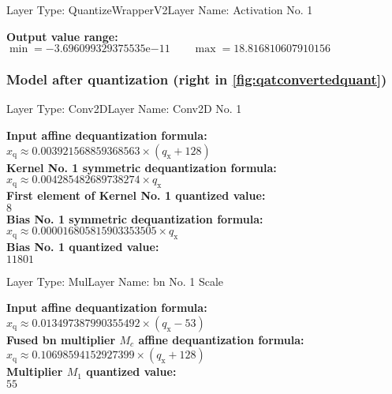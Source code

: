 {\begin{layerbox}{Layer Type: QuantizeWrapperV2}{Layer Name: Activation No. 1}
  \begin{center}
    \textbf{Output value range:} \\[2pt]
    $\min = -3.696099329375535 \mathrm{e}{-11} \quad\quad \max = 18.816810607910156$
  \end{center}
\end{layerbox}

\clearpage
\subsubsection*{Model after quantization (right in \autoref{fig:qatconvertedquant})}

\begin{layerbox}{Layer Type: Conv2D}{Layer Name: Conv2D No. 1}
  \begin{center}
    \textbf{Input affine dequantization formula:} \\[2pt]
    $x_{\text{q}} \approx 0.003921568859368563 \times (q_{\text{x}} + 128)$ \\[6pt]
    \textbf{Kernel No. 1 symmetric dequantization formula:} \\[2pt]
    $x_{\text{q}} \approx 0.004285482689738274 \times q_{\text{x}}$ \\[6pt]
    \textbf{First element of Kernel No. 1 quantized value:} \\[2pt]
    $8$ \\[6pt]
    \textbf{Bias No. 1 symmetric dequantization formula:} \\[2pt]
    $x_{\text{q}} \approx 0.000016805815903353505 \times q_{\text{x}}$ \\[6pt]
    \textbf{Bias No. 1 quantized value:} \\[2pt]
    $11801$ \\[6pt]
  \end{center}
\end{layerbox}

\begin{layerbox}{Layer Type: Mul}{Layer Name: \gls{bn} No. 1 Scale}
  \begin{center}
    \textbf{Input affine dequantization formula:} \\[2pt]
    $x_{\text{q}} \approx 0.013497387990355492 \times (q_{\text{x}} - 53)$ \\[6pt]
    \textbf{Fused \gls{bn} multiplier $M_c$ affine dequantization formula:} \\[2pt]
    $x_{\text{q}} \approx 0.10698594152927399 \times (q_{\text{x}} + 128)$ \\[6pt]
    \textbf{Multiplier $M_1$ quantized value:} \\[2pt]
    $55$ \\[6pt]
  \end{center}
\end{layerbox}

}
